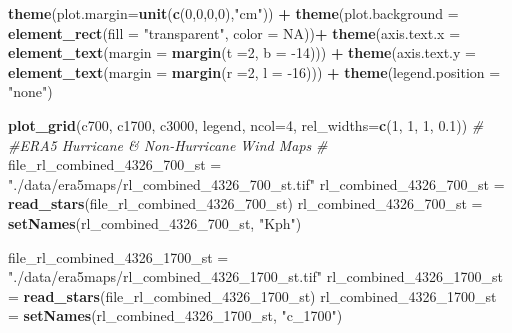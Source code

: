 \documentclass[12pt,twoside]{reedthesis}
\newenvironment{Shaded}{\begin{snugshade}}{\end{snugshade}}
\newcommand{\CommentTok}[1]{\textcolor[rgb]{0.56,0.35,0.01}{\textit{#1}}}
\newcommand{\DataTypeTok}[1]{\textcolor[rgb]{0.13,0.29,0.53}{#1}}
\newcommand{\DecValTok}[1]{\textcolor[rgb]{0.00,0.00,0.81}{#1}}
\newcommand{\FloatTok}[1]{\textcolor[rgb]{0.00,0.00,0.81}{#1}}
\newcommand{\KeywordTok}[1]{\textcolor[rgb]{0.13,0.29,0.53}{\textbf{#1}}}
\newcommand{\NormalTok}[1]{#1}
\newcommand{\OperatorTok}[1]{\textcolor[rgb]{0.81,0.36,0.00}{\textbf{#1}}}
\newcommand{\OtherTok}[1]{\textcolor[rgb]{0.56,0.35,0.01}{#1}}
\newcommand{\StringTok}[1]{\textcolor[rgb]{0.31,0.60,0.02}{#1}}
\begin{document}
\begin{Shaded}
\begin{Highlighting}[]
\StringTok{  }\KeywordTok{theme}\NormalTok{(}\DataTypeTok{plot.margin=}\KeywordTok{unit}\NormalTok{(}\KeywordTok{c}\NormalTok{(}\DecValTok{0}\NormalTok{,}\DecValTok{0}\NormalTok{,}\DecValTok{0}\NormalTok{,}\DecValTok{0}\NormalTok{),}\StringTok{"cm"}\NormalTok{)) }\OperatorTok{+}
\StringTok{  }\KeywordTok{theme}\NormalTok{(}\DataTypeTok{plot.background =} \KeywordTok{element_rect}\NormalTok{(}\DataTypeTok{fill =} \StringTok{"transparent"}\NormalTok{, }\DataTypeTok{color =} \OtherTok{NA}\NormalTok{))}\OperatorTok{+}
\StringTok{  }\KeywordTok{theme}\NormalTok{(}\DataTypeTok{axis.text.x =} \KeywordTok{element_text}\NormalTok{(}\DataTypeTok{margin =}  \KeywordTok{margin}\NormalTok{(}\DataTypeTok{t =}\DecValTok{2}\NormalTok{, }\DataTypeTok{b =} \DecValTok{-14}\NormalTok{))) }\OperatorTok{+}\StringTok{ }
\StringTok{  }\KeywordTok{theme}\NormalTok{(}\DataTypeTok{axis.text.y =} \KeywordTok{element_text}\NormalTok{(}\DataTypeTok{margin =}  \KeywordTok{margin}\NormalTok{(}\DataTypeTok{r =}\DecValTok{2}\NormalTok{, }\DataTypeTok{l =} \DecValTok{-16}\NormalTok{))) }\OperatorTok{+}
\StringTok{  }\KeywordTok{theme}\NormalTok{(}\DataTypeTok{legend.position =} \StringTok{"none"}\NormalTok{)}

\KeywordTok{plot_grid}\NormalTok{(c700, c1700, c3000, legend, }\DataTypeTok{ncol=}\DecValTok{4}\NormalTok{, }\DataTypeTok{rel_widths=}\KeywordTok{c}\NormalTok{(}\DecValTok{1}\NormalTok{, }\DecValTok{1}\NormalTok{, }\DecValTok{1}\NormalTok{, }\FloatTok{0.1}\NormalTok{))}
\CommentTok{#}
\CommentTok{#ERA5 Hurricane & Non-Hurricane Wind Maps}
\CommentTok{#}
\NormalTok{file_rl_combined_}\DecValTok{4326}\NormalTok{_}\DecValTok{700}\NormalTok{_st =}\StringTok{ "./data/era5maps/rl_combined_4326_700_st.tif"}
\NormalTok{rl_combined_}\DecValTok{4326}\NormalTok{_}\DecValTok{700}\NormalTok{_st =}\StringTok{ }\KeywordTok{read_stars}\NormalTok{(file_rl_combined_}\DecValTok{4326}\NormalTok{_}\DecValTok{700}\NormalTok{_st)}
\NormalTok{rl_combined_}\DecValTok{4326}\NormalTok{_}\DecValTok{700}\NormalTok{_st =}\StringTok{ }\KeywordTok{setNames}\NormalTok{(rl_combined_}\DecValTok{4326}\NormalTok{_}\DecValTok{700}\NormalTok{_st, }\StringTok{"Kph"}\NormalTok{)}

\NormalTok{file_rl_combined_}\DecValTok{4326}\NormalTok{_}\DecValTok{1700}\NormalTok{_st =}\StringTok{ "./data/era5maps/rl_combined_4326_1700_st.tif"}
\NormalTok{rl_combined_}\DecValTok{4326}\NormalTok{_}\DecValTok{1700}\NormalTok{_st =}\StringTok{ }\KeywordTok{read_stars}\NormalTok{(file_rl_combined_}\DecValTok{4326}\NormalTok{_}\DecValTok{1700}\NormalTok{_st)}
\NormalTok{rl_combined_}\DecValTok{4326}\NormalTok{_}\DecValTok{1700}\NormalTok{_st =}\StringTok{ }\KeywordTok{setNames}\NormalTok{(rl_combined_}\DecValTok{4326}\NormalTok{_}\DecValTok{1700}\NormalTok{_st, }\StringTok{"c_1700"}\NormalTok{)}


\end{Highlighting}
\end{Shaded}
\end{document}
